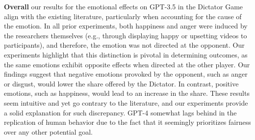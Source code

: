 \documentclass{article}
\begin{document}
\textbf{Overall} our results for the emotional effects on GPT-3.5 in the Dictator Game align with the existing literature, particularly when accounting for the cause of the emotion. In all prior experiments, both happiness and anger were induced by the researchers themselves (e.g., through displaying happy or upsetting videos to participants), and therefore, the emotion was not directed at the opponent. Our experiments highlight that this distinction is pivotal in determining outcomes, as the same emotions exhibit opposite effects when directed at the other player. Our findings suggest that negative emotions provoked by the opponent, such as anger or disgust, would lower the share offered by the Dictator. In contrast, positive emotions, such as happiness, would lead to an increase in the share. These results seem intuitive and yet go contrary to the literature, and our experiments provide a solid explanation for such discrepancy. GPT-4 somewhat lags behind in the replication of human behavior due to the fact that it seemingly prioritizes fairness over any other potential goal. 


\end{document}
